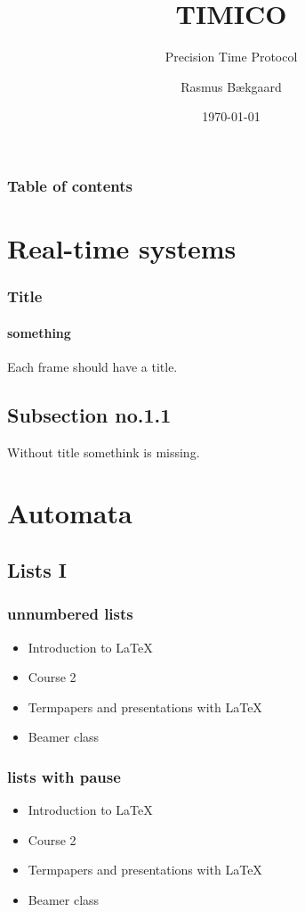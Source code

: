 \documentclass{beamer}
\title{TIMICO}
\subtitle{Precision Time Protocol}
\author{Rasmus Bækgaard}
\institute{Aarhus University}
\date{\today}
\begin{document}
\begin{frame}[plain]
\titlepage
\end{frame}


\begin{frame}
\frametitle{Table of contents}
\tableofcontents
\end{frame} 


\section{Real-time systems} 
\begin{frame}\frametitle{Title}\framesubtitle{something}
Each frame should have a title.
\end{frame}
\subsection{Subsection no.1.1  }
\begin{frame} 
Without title somethink is missing. 
\end{frame}


\section{Automata} 
\subsection{Lists I}
\begin{frame}\frametitle{unnumbered lists}
\begin{itemize}
\item Introduction to  \LaTeX  
\item Course 2 
\item Termpapers and presentations with \LaTeX 
\item Beamer class
\end{itemize} 
\end{frame}

\begin{frame}\frametitle{lists with pause}
\begin{itemize}
\item Introduction to  \LaTeX \pause 
\item Course 2 \pause 
\item Termpapers and presentations with \LaTeX \pause 
\item Beamer class
\end{itemize} 
\end{frame}
\end{document}
